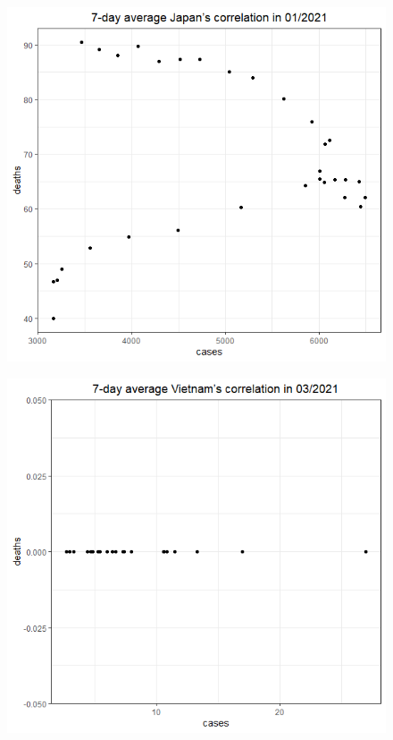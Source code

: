 \documentclass[a4paper]{article}
\theoremstyle{definition}
\begin{document}
\begin{enumerate}[1)]
\begin{figure}[H]
\begin{center}
        \includegraphics[scale = 0.3]{ix/ix.3/JPN_01_2021.png}
    \end{center}
    \end{figure}
    \begin{figure}[H]
    \begin{center}
        \includegraphics[scale = 0.3]{ix/ix.3/VN_03_2021.png}

\end{center}
\end{figure}
\end{enumerate}
\end{document}
